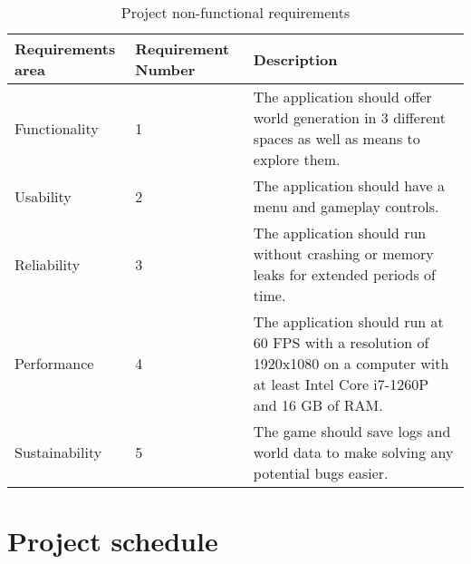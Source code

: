 \documentclass[12pt]{article}
\begin{document}
\begin{table}[H]
	\begin{tabular}{|l|p{2.2cm}|p{11cm}|}
		\hline
		\textbf{Requirements area} & \textbf{Requirement Number} & \textbf{Description}                                                                                                                  \\ \hline
		Functionality              & 1                           & The application should offer world generation in 3 different spaces as well as means to explore them.                                 \\ \hline
		Usability                  & 2                           & The application should have a menu and gameplay controls.                                                                             \\ \hline
		Reliability                & 3                           & The application should run without crashing or memory leaks for extended periods of time.                                             \\ \hline
		Performance                & 4                           & The application should run at 60 FPS with a resolution of 1920x1080 on a computer with at least Intel Core i7-1260P and 16 GB of RAM. \\ \hline
		Sustainability             & 5                           & The game should save logs and world data to make solving any potential bugs easier.                                                   \\ \hline
	\end{tabular}
	\caption{Project non-functional requirements}
\end{table}


\section{Project schedule} %
\end{document}
